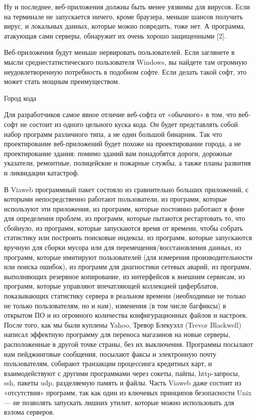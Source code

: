 \documentclass[ebook,12pt,oneside,openany]{memoir}
\begin{document}
Ну и последнее, веб-приложения должны быть менее уязвимы для вирусов.
Если на терминале не запускается ничего, кроме браузера, меньше шансов
получить вирус, и локальных данных, которые можно повредить, тоже нет.
А программа, атакующая сами серверы, обнаружит их очень хорошо
защищенными [2].

Веб-приложения будут меньше нервировать пользователей. Если заглянете
в мысли среднестатистического пользователя Windows, вы найдете там
огромную неудовлетворенную потребность в подобном софте. Если делать
такой софт, это может стать мощным преимуществом.

Город кода

Для разработчиков самое явное отличие веб-софта от «обычного» в том,
что веб-софт не состоит из одного цельного куска кода. Он будет
представлять собой набор программ различного типа, а не один большой
бинарник. Так что проектирование веб-приложений будет похоже на
проектирование города, а не проектирование здания: помимо зданий вам
понадобятся дороги, дорожные указатели, ремонтные, полицейские и
пожарные службы, а также планы развития и ликвидации катастроф.

В Viaweb программный пакет состояло из сравнительно больших
приложений, с которыми непосредственно работают пользователи, из
программ, которые используют эти приложения, из программ, которые
постоянно работают в фоне для определения проблем, из программ,
которые пытаются рестартовать то, что сбойнуло, из программ, которые
запускаются время от времени, чтобы собрать статистику или построить
поисковые индексы, из программ, которые запускаются вручную для сборки
мусора или для перемещения/восстановления данных, из программ, которые
имитируют пользователей (для измерения производительности или поиска
ошибок), из программ для диагностики сетевых аварий, из программ,
выполняющих резервное копирование, из интерфейсов к внешним сервисам,
из программ, которые управляют впечатляющей коллекцией циферблатов,
показывающих статистику сервера в реальном времени (необходимые не
только не только пользователям, но и нам), изменения (в том числе
багфиксы) в открытом ПО и из огромного количества конфигурационных
файлов и настроек. После того, как мы были куплены Yahoo, Тревор
Блекуэлл (Trevor Blackwell) написал эффектную программу для переноса
магазинов на новые серверы, расположенные в другой точке страны, без
их выключения. Программы посылают нам пейджинговые сообщения, посылают
факсы и электронную почту пользователям, собирают транзакции
процессинга кредитных карт, и взаимодействуют с другими программами
через сокеты, пайпы, http-запросы, ssh, пакеты udp, разделяемую память
и файлы. Часть Viaweb даже состоит из «отсутствия» программ, так как
один из ключевых принципов безопасности Unix — не позволять запускать
лишних утилит, которые можно использовать для взлома серверов.
\end{document}
